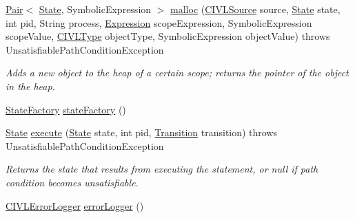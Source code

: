 \begin{DoxyCompactItemize}
\hyperlink{classedu_1_1udel_1_1cis_1_1vsl_1_1civl_1_1util_1_1IF_1_1Pair}{Pair}$<$ \hyperlink{interfaceedu_1_1udel_1_1cis_1_1vsl_1_1civl_1_1state_1_1IF_1_1State}{State}, Symbolic\+Expression $>$ \hyperlink{classedu_1_1udel_1_1cis_1_1vsl_1_1civl_1_1semantics_1_1common_1_1CommonExecutor_a1e177bfd7e714119aa7b2780a351d03b}{malloc} (\hyperlink{interfaceedu_1_1udel_1_1cis_1_1vsl_1_1civl_1_1model_1_1IF_1_1CIVLSource}{C\+I\+V\+L\+Source} source, \hyperlink{interfaceedu_1_1udel_1_1cis_1_1vsl_1_1civl_1_1state_1_1IF_1_1State}{State} state, int pid, String process, \hyperlink{interfaceedu_1_1udel_1_1cis_1_1vsl_1_1civl_1_1model_1_1IF_1_1expression_1_1Expression}{Expression} scope\+Expression, Symbolic\+Expression scope\+Value, \hyperlink{interfaceedu_1_1udel_1_1cis_1_1vsl_1_1civl_1_1model_1_1IF_1_1type_1_1CIVLType}{C\+I\+V\+L\+Type} object\+Type, Symbolic\+Expression object\+Value)  throws Unsatisfiable\+Path\+Condition\+Exception 
\begin{DoxyCompactList}\small\item\em Adds a new object to the heap of a certain scope; returns the pointer of the object in the heap. \end{DoxyCompactList}\item 
\hyperlink{interfaceedu_1_1udel_1_1cis_1_1vsl_1_1civl_1_1state_1_1IF_1_1StateFactory}{State\+Factory} \hyperlink{classedu_1_1udel_1_1cis_1_1vsl_1_1civl_1_1semantics_1_1common_1_1CommonExecutor_a096411de2dfadb1c2ad06f58cd427e28}{state\+Factory} ()
\item 
\hyperlink{interfaceedu_1_1udel_1_1cis_1_1vsl_1_1civl_1_1state_1_1IF_1_1State}{State} \hyperlink{classedu_1_1udel_1_1cis_1_1vsl_1_1civl_1_1semantics_1_1common_1_1CommonExecutor_a6a0a72525403eba73434a9ff50b9c323}{execute} (\hyperlink{interfaceedu_1_1udel_1_1cis_1_1vsl_1_1civl_1_1state_1_1IF_1_1State}{State} state, int pid, \hyperlink{interfaceedu_1_1udel_1_1cis_1_1vsl_1_1civl_1_1semantics_1_1IF_1_1Transition}{Transition} transition)  throws Unsatisfiable\+Path\+Condition\+Exception 
\begin{DoxyCompactList}\small\item\em Returns the state that results from executing the statement, or null if path condition becomes unsatisfiable. \end{DoxyCompactList}\item 
\hyperlink{classedu_1_1udel_1_1cis_1_1vsl_1_1civl_1_1log_1_1IF_1_1CIVLErrorLogger}{C\+I\+V\+L\+Error\+Logger} \hyperlink{classedu_1_1udel_1_1cis_1_1vsl_1_1civl_1_1semantics_1_1common_1_1CommonExecutor_a9836733bc543d40a62a3f7516a52c602}{error\+Logger} ()

\end{DoxyCompactItemize}
